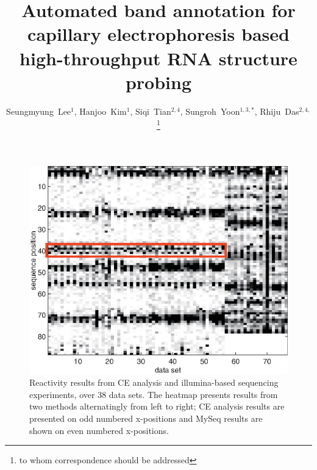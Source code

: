 \documentclass[letter]{bioinfo}
\begin{document}

\title[Automated band annotation for capillary electrophoresis]{Automated band annotation for capillary electrophoresis based high-throughput RNA structure probing}
\author[Lee \textit{et~al}]
{
Seungmyung~Lee$^{1}$,
Hanjoo~Kim$^{1}$,
Siqi~Tian$^{2,4}$,
Sungroh~Yoon$^{1,3,*}$,
Rhiju~Das$^{2,4,}$\footnote{to whom correspondence should be addressed}
}
\address{
$^{1}$Department of ECE, Seoul National University, Seoul 151-744, Korea, 
$^{2}$School of Medicine, Stanford, CA 94305, USA,
$^{3}$Interdisciplinary program in Bionformatics, Seoul National University, Seoul 151-744, Korea,
$^{4}$Departments of Biochemistry and Physics, Stanford, CA 94305, USA
}

\history{}


\maketitle



\begin{figure}
\centering
\includegraphics[width=\linewidth]{figures/eterna_comparison}
\caption{Reactivity results from CE analysis and illumina-based sequencing experiments, over 38 data sets. The heatmap presents results from two methods alternatingly from left to right; CE analysis results are presented on odd numbered x-positions and MySeq results are shown on even numbered x-positions.}
\label{f:eterna_comparison}
\end{figure}
\end{document}
